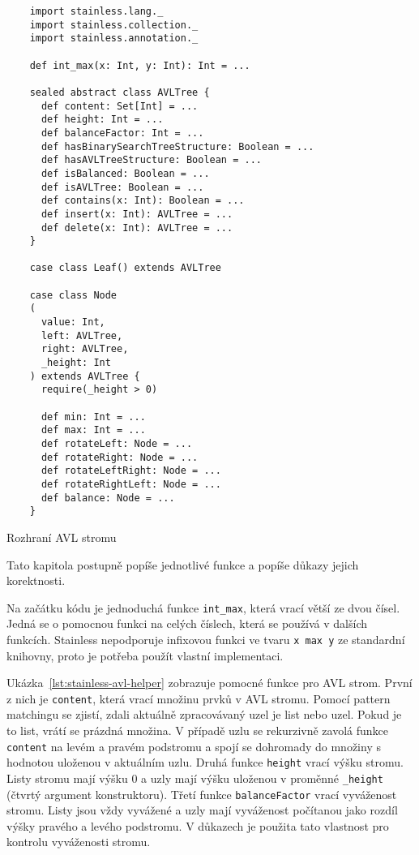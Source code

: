 \begin{listing}[H]
    \begin{verbatim}
    import stainless.lang._
    import stainless.collection._
    import stainless.annotation._

    def int_max(x: Int, y: Int): Int = ...

    sealed abstract class AVLTree {
      def content: Set[Int] = ...
      def height: Int = ...
      def balanceFactor: Int = ...
      def hasBinarySearchTreeStructure: Boolean = ...
      def hasAVLTreeStructure: Boolean = ...
      def isBalanced: Boolean = ...
      def isAVLTree: Boolean = ...
      def contains(x: Int): Boolean = ...
      def insert(x: Int): AVLTree = ...
      def delete(x: Int): AVLTree = ...
    }

    case class Leaf() extends AVLTree

    case class Node
    (
      value: Int,
      left: AVLTree,
      right: AVLTree,
      _height: Int
    ) extends AVLTree {
      require(_height > 0)

      def min: Int = ...
      def max: Int = ...
      def rotateLeft: Node = ...
      def rotateRight: Node = ...
      def rotateLeftRight: Node = ...
      def rotateRightLeft: Node = ...
      def balance: Node = ...
    }
    \end{verbatim}
    \caption{Rozhraní AVL stromu}
    \label{lst:stainless-avl-interface}
\end{listing}

Tato kapitola postupně popíše jednotlivé funkce a popíše důkazy jejich korektnosti.

Na začátku kódu je jednoduchá funkce \texttt{int\_max}, která vrací větší ze dvou čísel.
Jedná se o pomocnou funkci na celých číslech, která se používá v dalších funkcích.
Stainless nepodporuje infixovou funkci ve tvaru \texttt{x max y} ze standardní knihovny,
proto je potřeba použít vlastní implementaci.

Ukázka~\ref{lst:stainless-avl-helper} zobrazuje pomocné funkce pro AVL strom.
První z nich je \texttt{content}, která vrací množinu prvků v AVL stromu.
Pomocí pattern matchingu se zjistí, zdali aktuálně zpracovávaný uzel je list nebo uzel.
Pokud je to list, vrátí se prázdná množina.
V případě uzlu se rekurzivně zavolá funkce \texttt{content} na levém a pravém podstromu
a spojí se dohromady do množiny s hodnotou uloženou v aktuálním uzlu.
Druhá funkce \texttt{height} vrací výšku stromu.
Listy stromu mají výšku 0 a uzly mají výšku uloženou v proměnné \texttt{\_height} (čtvrtý argument konstruktoru).
Třetí funkce \texttt{balanceFactor} vrací vyváženost stromu.
Listy jsou vždy vyvážené a uzly mají vyváženost počítanou jako rozdíl výšky pravého a levého podstromu.
V důkazech je použita tato vlastnost pro kontrolu vyváženosti stromu.

